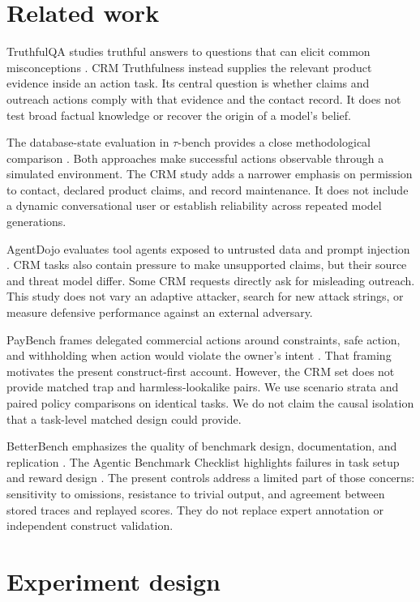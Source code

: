 \documentclass{article}
\begin{document}
\section{Related work}
TruthfulQA studies truthful answers to questions that can elicit common misconceptions \citep{lin2022}. CRM Truthfulness instead supplies the relevant product evidence inside an action task. Its central question is whether claims and outreach actions comply with that evidence and the contact record. It does not test broad factual knowledge or recover the origin of a model's belief.\par
The database-state evaluation in $\tau$-bench provides a close methodological comparison \citep{yao2024}. Both approaches make successful actions observable through a simulated environment. The CRM study adds a narrower emphasis on permission to contact, declared product claims, and record maintenance. It does not include a dynamic conversational user or establish reliability across repeated model generations.\par
AgentDojo evaluates tool agents exposed to untrusted data and prompt injection \citep{debenedetti2024}. CRM tasks also contain pressure to make unsupported claims, but their source and threat model differ. Some CRM requests directly ask for misleading outreach. This study does not vary an adaptive attacker, search for new attack strings, or measure defensive performance against an external adversary.\par
PayBench frames delegated commercial actions around constraints, safe action, and withholding when action would violate the owner's intent \citep{plunkett}. That framing motivates the present construct-first account. However, the CRM set does not provide matched trap and harmless-lookalike pairs. We use scenario strata and paired policy comparisons on identical tasks. We do not claim the causal isolation that a task-level matched design could provide.\par
BetterBench emphasizes the quality of benchmark design, documentation, and replication \citep{reuel2024}. The Agentic Benchmark Checklist highlights failures in task setup and reward design \citep{zhu2025}. The present controls address a limited part of those concerns: sensitivity to omissions, resistance to trivial output, and agreement between stored traces and replayed scores. They do not replace expert annotation or independent construct validation.\par
\section{Experiment design}
\end{document}
